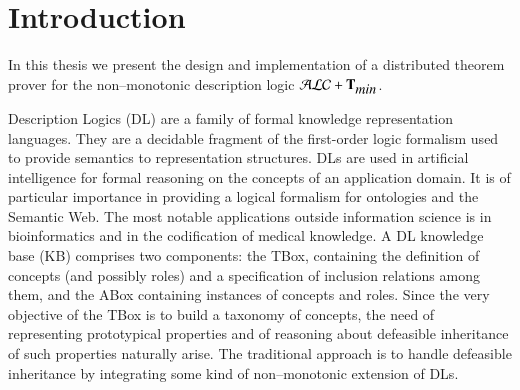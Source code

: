\documentclass[a4paper, 11pt, oneside]{elsarticle}
\newcommand{\tip}{{\bf T}}
\newcommand{\alctmin}{\mathcal{ALC}+\tip_{\mbox{\em min}}}
\begin{document}
\newpage


\tableofcontents

\newpage


\section{Introduction}

In this thesis we present the design and implementation of a distributed theorem prover for the non--monotonic description logic $\alctmin$.

Description Logics (DL) are a family of formal knowledge representation languages. They are a decidable fragment of the first-order logic formalism used to provide semantics to representation structures.
DLs are used in artificial intelligence for formal reasoning on the concepts of an application domain. It is of particular importance in providing a logical formalism for ontologies and the Semantic Web. The most notable applications outside information science is in bioinformatics and in the codification of medical knowledge. A DL knowledge base (KB) comprises two components: the TBox, containing the definition of concepts (and possibly roles) and a specification of inclusion relations among them, and the ABox containing instances of concepts and roles. Since the very objective of the TBox is to build a taxonomy of concepts, the need of representing prototypical properties and of reasoning about defeasible inheritance of such properties naturally arise. The traditional approach is to handle defeasible inheritance by integrating some kind of non--monotonic extension of DLs.


\end{document}
